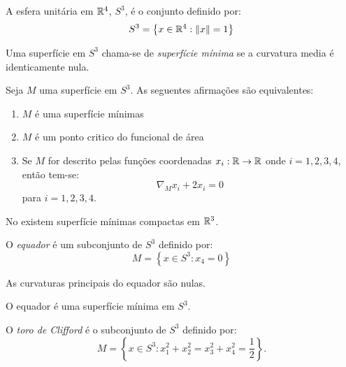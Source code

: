 \cite{Brendle2013}

\begin{definicao}
	A esfera unitária em $\mathbb{R}^4$, $S^3$, é o conjunto definido por:
	\begin{equation*}
		S^3 = \left\{ x \in \mathbb{R}^4: \| x \| = 1 \right\}
	\end{equation*}
\end{definicao}

\begin{definicao}
	Uma superfície em $S^3$ chama-se de \emph{superfície mínima} se a curvatura media é identicamente nula.
\end{definicao}

\begin{teorema}
	Seja $M$ uma superfície em $S^3$. As seguentes afirmações são equivalentes:
	\begin{enumerate}
		\item $M$ é uma superfície mínimas
		\item $M$ é um ponto critico do funcional de área
		\item Se $M$ for descrito pelas funções coordenadas $x_i: \mathbb{R} \rightarrow \mathbb{R}$ onde $i=1,2,3,4$, então tem-se:
		\begin{equation*}
			\nabla_{M} x_i + 2 x_i = 0
		\end{equation*}
		para $i=1,2,3,4$.
	\end{enumerate}
\end{teorema}

\begin{observacao}
	No existem superfície mínimas compactas em $\mathbb{R}^3$.
\end{observacao}

\begin{definicao}
	O \emph{equador} é um subconjunto de $S^3$ definido por:
	\begin{equation}
		M = \left\{ x \in S^3: x_4 = 0 \right\}
	\end{equation}
\end{definicao}

\begin{proposicao}
	As curvaturas principais do equador são nulas.
\end{proposicao}

\begin{corolario}
	O equador é uma superfície mínima em $S^3$.
\end{corolario}

\begin{definicao}
	O \emph{toro de Clifford} é o subconjunto de $S^3$ definido por:
	\begin{equation*}
		M = \left\{ x \in S^3: x_1^2 + x_2^2 = x_3^2 + x_4^2 = \frac{1}{2} \right\}.
	\end{equation*}
\end{definicao}

